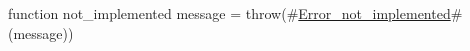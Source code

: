 function not_implemented message = throw(#\hyperref[sailRISCVzErrorzynotzyimplemented]{Error\_not\_implemented}#(message))
